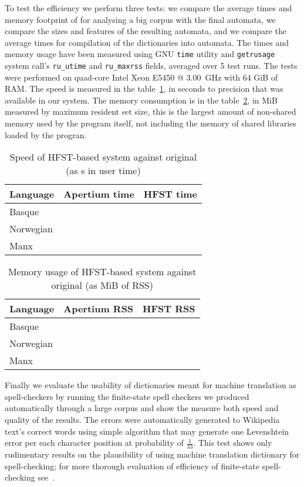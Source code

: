\documentclass[10pt,a4paper]{article}
\begin{document}
To test the efficiency we perform three tests: we compare the average times and
memory footprint of for analysing a big corpus with the final automata, we
compare the sizes and features of the resulting automata, and we compare the
average times for compilation of the dictionaries into automata. The times and
memory usage have been measured using GNU \texttt{time} utility and
\texttt{getrusage} system call's \texttt{ru\_utime} and 
\texttt{ru\_maxrss} fields, averaged over 5 test runs. The tests were performed
on quad-core Intel Xeon E5450 @ 3.00~GHz with 64 GiB of RAM. The speed is
measured in the table~\ref{table:speed}, in seconds to precision that was
available in our system. The memory consumption is in the
table~\ref{table:memory}, in MiB measured by maximum resident set size, this is
the largest amount of non-shared memory used by the program itself, not
including the memory of shared libraries loaded by the progran. 


\begin{table}[h]
\begin{center}
\begin{tabular}{|l|r|r|}
\hline
\bf Language & \bf Apertium time & \bf HFST time \\
\hline
Basque       & & \\
Norwegian    & & \\
Manx         & & \\
\hline
\end{tabular}
\caption{Speed of HFST-based system against original (as s in user time)
\label{table:speed}}
\end{center}
\end{table}

\begin{table}[h]
\begin{center}
\begin{tabular}{|l|r|r|}
\hline
\bf Language & \bf Apertium RSS & \bf HFST RSS \\
\hline
Basque       & & \\
Norwegian    & & \\
Manx         & & \\
\hline
\end{tabular}
\caption{Memory usage of HFST-based system against original (as MiB of RSS)
\label{table:memory}}
\end{center}
\end{table}

Finally we evaluate the usability of dictionaries meant for machine translation
as spell-checkers by running the finite-state spell checkers we produced
automatically through a large corpus and show the measure both speed and
quality of the results. The errors were automatically generated to Wikipedia
text's correct words using simple algorithm that may generate one Levenshtein
error per each character position at probability of $\frac{1}{33}$.  This test
shows only rudimentary results on the plausibility of using machine translation
dictionary for spell-checking; for more thorough evaluation of efficiency of
finite-state spell-checking see~\cite{hassan/2008}.
\end{document}
